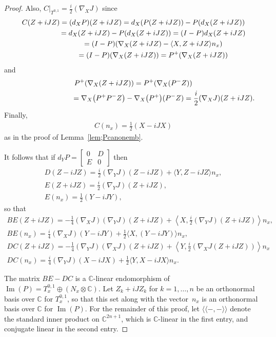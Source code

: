 \documentclass[11pt]{article}
\numberwithin{equation}{section}
\newcommand{\CC}{\mathbb{C}}
\begin{document}
\begin{proof}
Also, $C \big|_{T^{0,1}} = \frac{i}{ 2} (\nabla_X J) $ since
\begin{gather*}
C(Z+iJZ) = (d_X P)(Z+iJZ) = d_X(P(Z + iJZ)) - P(d_X(Z+iJZ)) \\
\hphantom{C(Z+iJZ)}{} =d_X(Z + iJZ) - P(d_X(Z+iJZ)) = (I-P)d_X (Z+iJZ) \\
\hphantom{C(Z+iJZ)}{} = (I-P) ( \nabla_X (Z+iJZ) - \langle X,Z + iJZ \rangle n_x ) \\
\hphantom{C(Z+iJZ)}{} =(I-P) ( \nabla_X (Z+iJZ) ) = P^+ ( \nabla_X (Z+iJZ))
\end{gather*}
and
\begin{gather*}
 P^+ ( \nabla_X (Z+iJZ) ) = P^+ ( \nabla_X (P^- Z) ) \\
 \hphantom{P^+ ( \nabla_X (Z+iJZ) )}{} = \nabla_X \big( P^+ P^- Z\big)- \nabla_X\big(P^+\big) (P^-Z) = \frac{i}{2} (\nabla_X J) (Z + i J Z).
 \end{gather*}
 Finally,
\begin{gather*}
C(n_x) = \frac 1 2 (X - i J X)
\end{gather*}
as in the proof of Lemma~\ref{lem;Pcanonemb}.

It follows that if $d_YP =\left[
\begin{smallmatrix}
0 & D \\
E& 0
\end{smallmatrix}\right]$ then
\begin{gather*}
D(Z-iJZ) = \frac i 2 (\nabla_Y J) (Z-iJZ) + \langle Y , Z-iJZ \rangle n_x, \\
E (Z+iJZ) = \frac{i}{ 2} (\nabla_Y J)(Z+iJZ) ,\\
E(n_x) = \frac 1 2 (Y - i J Y),
\end{gather*}
so that
\begin{gather*}
BE (Z+iJZ) = -\frac{1}{4} (\nabla_X J) (\nabla_Y J)(Z+iJZ) + \left\langle X , \frac{i}{ 2} (\nabla_Y J)(Z+iJZ) \right\rangle n_x, \\
BE(n_x) = \frac i 4 (\nabla_X J) (Y - i J Y) + \frac 1 2 \langle X , (Y - i J Y) \rangle n_x, \\
DC(Z+iJZ) = -\frac{1}{4} (\nabla_Y J) (\nabla_X J)(Z+iJZ) + \left\langle Y , \frac{i}{ 2} ( \nabla_X J (Z+iJZ)) \right\rangle n_x \\
DC(n_x) = \frac i 4 (\nabla_Y J) (X-iJX) + \frac 1 2\langle Y , X-iJX \rangle n_x.
\end{gather*}

The matrix $BE-DC$ is a $\CC$-linear endomorphism of $\operatorname{Im}(P) = T^{0,1}_x \oplus (N_x \otimes \CC)$. Let $Z_k + i J Z_k$ for $k=1,\ldots ,n$ be an orthonormal basis over $\CC$ for $T^{0,1}_x$, so that this set along with the vector~$n_x$ is an orthonormal basis over $\CC$ for $\operatorname{Im}(P)$. For the remainder of this proof, let $\langle\langle - , - \rangle\rangle $ denote the standard inner product on $\CC^{2n+1}$, which is $\CC$-linear in the first entry, and conjugate linear in the second entry.


\end{proof}
\end{document}
